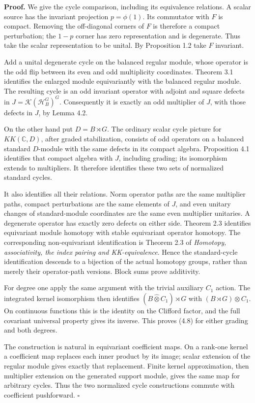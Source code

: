 \documentclass[
  11pt,
]{article}
\begin{document}
\textbf{Proof.} We give the cycle comparison, including its equivalence
relations. A scalar source has the invariant projection \(p=\phi(1)\).
Its commutator with \(F\) is compact. Removing the off-diagonal corners
of \(F\) is therefore a compact perturbation; the \(1-p\) corner has
zero representation and is degenerate. Thus take the scalar
representation to be unital. By Proposition 1.2 take \(F\) invariant.

Add a unital degenerate cycle on the balanced regular module, whose
operator is the odd flip between its even and odd multiplicity
coordinates. Theorem 3.1 identifies the enlarged module equivariantly
with the balanced regular module. The resulting cycle is an odd
invariant operator with adjoint and square defects in
\(J=\mathcal K(\mathcal H_B^G)^G\). Consequently it is exactly an odd
multiplier of \(J\), with those defects in \(J\), by Lemma 4.2.

On the other hand put \(D=B\rtimes G\). The ordinary scalar cycle
picture for \(KK(\mathbb C,D)\), after graded stabilization, consists of
odd operators on a balanced standard \(D\)-module with the same defects
in its compact algebra. Proposition 4.1 identifies that compact algebra
with \(J\), including grading; its isomorphism extends to multipliers.
It therefore identifies these two sets of normalized standard cycles.

It also identifies all their relations. Norm operator paths are the same
multiplier paths, compact perturbations are the same elements of \(J\),
and even unitary changes of standard-module coordinates are the same
even multiplier unitaries. A degenerate operator has exactly zero
defects on either side. Theorem 2.3 identifies equivariant module
homotopy with stable equivariant operator homotopy. The corresponding
non-equivariant identification is Theorem 2.3 of \emph{Homotopy,
associativity, the index pairing and KK-equivalence}. Hence the
standard-cycle identification descends to a bijection of the actual
homotopy groups, rather than merely their operator-path versions. Block
sums prove additivity.

For degree one apply the same argument with the trivial auxiliary
\(C_1\) action. The integrated kernel isomorphism then identifies
\((B\widehat\otimes C_1)\rtimes G\) with
\((B\rtimes G)\widehat\otimes C_1\). On continuous functions this is the
identity on the Clifford factor, and the full covariant universal
property gives its inverse. This proves (4.8) for either grading and
both degrees.

The construction is natural in equivariant coefficient maps. On a
rank-one kernel a coefficient map replaces each inner product by its
image; scalar extension of the regular module gives exactly that
replacement. Finite kernel approximation, then multiplier extension on
the generated support module, gives the same map for arbitrary cycles.
Thus the two normalized cycle constructions commute with coefficient
pushforward. \(\square\)
\end{document}
